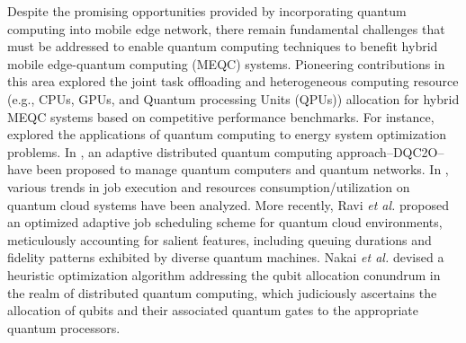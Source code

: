 \documentclass[journal]{IEEEtran}
\begin{document}
Despite the promising opportunities provided by incorporating quantum computing into mobile edge network, there remain fundamental challenges that must be addressed to enable quantum computing techniques to benefit hybrid mobile edge-quantum computing (MEQC) systems.
Pioneering contributions in this area \cite{ngoenriang2022optimal, cicconetti2022resource, ngoenriang2023dqc2o} explored the joint task offloading and heterogeneous computing resource (e.g., CPUs, GPUs, and Quantum processing Units (QPUs)) allocation for hybrid MEQC systems based on competitive performance benchmarks.
For instance, \cite{ajagekar2019quantum} explored the applications of quantum computing to energy system optimization problems. In \cite{ngoenriang2023dqc2o}, an adaptive distributed quantum computing approach--DQC2O--have been proposed to manage quantum computers and quantum networks.
In \cite{ravi2021quantum}, various trends in job execution and resources consumption/utilization on quantum cloud systems have been analyzed.
More recently, Ravi {\em et al.} \cite{ravi2021adaptive} proposed an optimized adaptive job scheduling scheme for quantum cloud environments, meticulously accounting for salient features, including queuing durations and fidelity patterns exhibited by diverse quantum machines.
Nakai {\em et al.} \cite{nakaiqubit} devised a heuristic optimization algorithm addressing the qubit allocation conundrum in the realm of distributed quantum computing, which judiciously ascertains the allocation of qubits and their associated quantum gates to the appropriate quantum processors.
\end{document}
